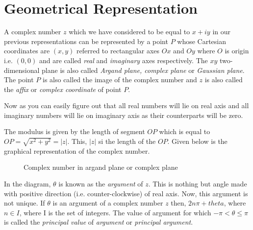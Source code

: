 \section{Geometrical Representation}
A complex number $z$ which we have considered to be equal to $x+iy$ in our previous representations can be represented by a point
$P$ whose Cartesian coordinates are $(x,y)$ referred to rectangular axes $Ox$ and $Oy$ where $O$ is origin i.e. $(0, 0)$ and are
called \textit{real} and \textit{imaginary} axes respectively. The $xy$ two-dimensional plane is also called \textit{Argand plane,
complex plane} or \textit{Gaussian plane}. The point $P$ is also called the image of the complex number and $z$ is also called
the \textit{affix} or \textit{complex coordinate} of point $P$.

Now as you can easily figure out that all real numbers will lie on real axis and all imaginary numbers will lie on imaginary axis
as their counterparts will be zero.

The modulus is given by the length of segment $OP$ which is equal to $OP=\sqrt{x^2+y^2}=|z|$. This, $|z|$ si the length of the
$OP$. Given below is the graphical representation of the complex number.

\begin{figure}[H]
  \begin{center}
    \caption{Complex number in argand plane or complex plane}
  \end{center}
\end{figure}

In the diagram, $\theta$ is known as the \textit{argument} of $z$. This is nothing but angle made with positive direction
(i.e. counter-clockwise) of real axis. Now, this argument is not unique. If $\theta$ is an argument of a complex number $z$ then,
$2n\pi + theta$, where $n\in I$, where I is the set of integers. The value of argument for which $-\pi<\theta\leq \pi$ is called
the \textit{principal value} of \textit{argument} or \textit{principal argument}.

